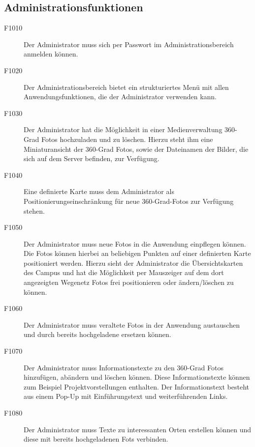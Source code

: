 \subsection{Administrationsfunktionen}
\label{sec:Administrationsfunktionen}

\begin{description}
  \item[F1010] Der Administrator muss sich per Passwort im Administrationsbereich anmelden können.
  \item[F1020] Der Administrationsbereich bietet ein strukturiertes Menü mit allen Anwendungsfunktionen, die der Administrator verwenden kann.
  \item[F1030] Der Administrator hat die Möglichkeit in einer Medienverwaltung 360-Grad Fotos hochzuladen und zu löschen. Hierzu steht ihm eine Miniaturansicht der 360-Grad Fotos, sowie der Dateinamen der Bilder, die sich auf dem Server befinden, zur Verfügung.
  \item[F1040] Eine definierte Karte muss dem Administrator als Positionierungseinschränkung für neue 360-Grad-Fotos zur Verfügung stehen.
  \item[F1050] Der Administrator muss neue Fotos in die Anwendung einpflegen können. Die Fotos können hierbei an beliebigen Punkten auf einer definierten Karte positioniert werden. Hierzu sieht der Administrator die Übersichtskarten des Campus und hat die Möglichkeit per Mauszeiger auf dem dort angezeigten Wegenetz Fotos frei positionieren oder ändern/löschen zu können.
  \item[F1060] Der Administrator muss veraltete Fotos in der Anwendung austauschen und durch bereits hochgeladene ersetzen können.
  \item[F1070] Der Administrator muss Informationstexte zu den 360-Grad Fotos hinzufügen, abändern und löschen können. Diese Informationstexte können zum Beispiel Projektvorstellungen enthalten. Der Informationstext besteht aus einem Pop-Up mit Einführungstext und weiterführenden Links.
  \item[F1080] Der Administrator muss Texte zu interessanten Orten erstellen können und diese mit bereits hochgeladenen Fots verbinden.
\end{description}